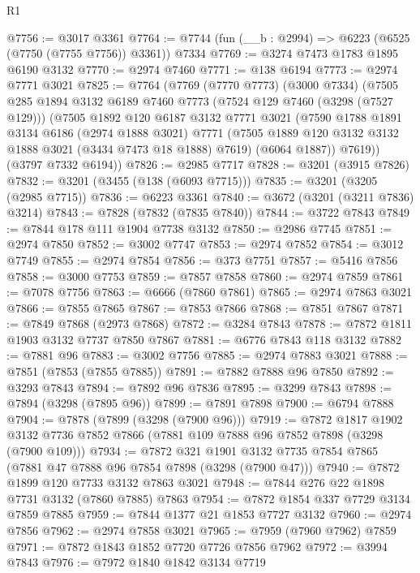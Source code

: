 \begin{lexlean}{R1}
\begin{coremodule}
@7756 := @3017 @3361
@7764 := @7744 (fun (__b : @2994) => @6223 (@6525 (@7750 (@7755 @7756)) @3361)) @7334
@7769 := @3274 @7473 @1783 @1895 @6190 @3132
@7770 := @2974 @7460
@7771 := @138 @6194
@7773 := @2974 @7771 @3021
@7825 := @7764
    (@7769
      (@7770 @7773)
      (@3000 @7334)
      (@7505
        @285
        @1894
        @3132
        @6189
        @7460
        @7773
        (@7524 @129 @7460 (@3298 (@7527 @129)))
        (@7505
          @1892
          @120
          @6187
          @3132
          @7771
          @3021
          (@7590
            @1788
            @1891
            @3134
            @6186
            (@2974 @1888 @3021)
            @7771
            (@7505 @1889 @120 @3132 @3132 @1888 @3021 (@3434 @7473 @18 @1888) @7619)
            (@6064 @1887))
          @7619))
      (@3797 @7332 @6194))
@7826 := @2985 @7717
@7828 := @3201 (@3915 @7826)
@7832 := @3201 (@3455 (@138 (@6093 @7715)))
@7835 := @3201 (@3205 (@2985 @7715))
@7836 := @6223 @3361
@7840 := @3672 (@3201 (@3211 @7836) @3214)
@7843 := @7828 (@7832 (@7835 @7840))
@7844 := @3722 @7843
@7849 := @7844 @178 @111 @1904 @7738 @3132
@7850 := @2986 @7745
@7851 := @2974 @7850
@7852 := @3002 @7747
@7853 := @2974 @7852
@7854 := @3012 @7749
@7855 := @2974 @7854
@7856 := @373 @7751
@7857 := @5416 @7856
@7858 := @3000 @7753
@7859 := @7857 @7858
@7860 := @2974 @7859
@7861 := @7078 @7756
@7863 := @6666 (@7860 @7861)
@7865 := @2974 @7863 @3021
@7866 := @7855 @7865
@7867 := @7853 @7866
@7868 := @7851 @7867
@7871 := @7849 @7868 (@2973 @7868)
@7872 := @3284 @7843
@7878 := @7872 @1811 @1903 @3132 @7737 @7850 @7867
@7881 := @6776 @7843 @118 @3132
@7882 := @7881 @96
@7883 := @3002 @7756
@7885 := @2974 @7883 @3021
@7888 := @7851 (@7853 (@7855 @7885))
@7891 := @7882 @7888 @96 @7850
@7892 := @3293 @7843
@7894 := @7892 @96 @7836
@7895 := @3299 @7843
@7898 := @7894 (@3298 (@7895 @96))
@7899 := @7891 @7898
@7900 := @6794 @7888
@7904 := @7878 (@7899 (@3298 (@7900 @96)))
@7919 := @7872
    @1817
    @1902
    @3132
    @7736
    @7852
    @7866
    (@7881 @109 @7888 @96 @7852 @7898 (@3298 (@7900 @109)))
@7934 := @7872
    @321
    @1901
    @3132
    @7735
    @7854
    @7865
    (@7881 @47 @7888 @96 @7854 @7898 (@3298 (@7900 @47)))
@7940 := @7872 @1899 @120 @7733 @3132 @7863 @3021
@7948 := @7844 @276 @22 @1898 @7731 @3132 (@7860 @7885) @7863
@7954 := @7872 @1854 @337 @7729 @3134 @7859 @7885
@7959 := @7844 @1377 @21 @1853 @7727 @3132
@7960 := @2974 @7856
@7962 := @2974 @7858 @3021
@7965 := @7959 (@7960 @7962) @7859
@7971 := @7872 @1843 @1852 @7720 @7726 @7856 @7962
@7972 := @3994 @7843
@7976 := @7972 @1840 @1842 @3134 @7719

\end{coremodule}
\end{lexlean}
